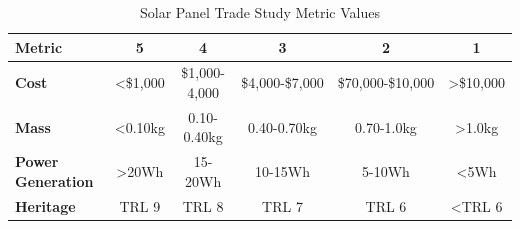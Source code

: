 \begin{table}[H]
\centering
\begin{tabular}{|l|c|c|c|c|c|} 
\hline
    \textbf{Metric} & \textbf{5} & \textbf{4} & \textbf{3} & \textbf{2} & \textbf{1}
    \\
\hline
    \textbf{Cost} & <\$1,000 & \$1,000-4,000 & \$4,000-\$7,000 & \$70,000-\$10,000 & >\$10,000 
    \\
\hline
    \textbf{Mass} & <0.10kg & 0.10-0.40kg & 0.40-0.70kg & 0.70-1.0kg & >1.0kg 
    \\    
\hline
    \textbf{Power Generation} & >20Wh & 15-20Wh & 10-15Wh & 5-10Wh & <5Wh 
    \\
\hline
    \textbf{Heritage} & TRL 9 & TRL 8 & TRL 7 & TRL 6 & <TRL 6 
    \\
\hline
\end{tabular}
\caption{Solar Panel Trade Study Metric Values}
\label{tbl:SolarPanel_Metric_Scores}
\end{table}
